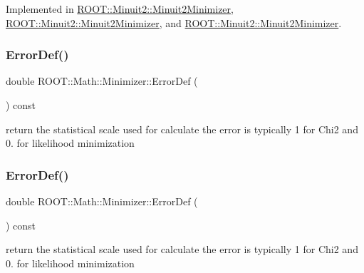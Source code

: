 Implemented in \mbox{\hyperlink{classROOT_1_1Minuit2_1_1Minuit2Minimizer_ab9c1bfaaaf4c12acd1fd96ece3509269}{R\+O\+O\+T\+::\+Minuit2\+::\+Minuit2\+Minimizer}}, \mbox{\hyperlink{classROOT_1_1Minuit2_1_1Minuit2Minimizer_ab9c1bfaaaf4c12acd1fd96ece3509269}{R\+O\+O\+T\+::\+Minuit2\+::\+Minuit2\+Minimizer}}, and \mbox{\hyperlink{classROOT_1_1Minuit2_1_1Minuit2Minimizer_ab9c1bfaaaf4c12acd1fd96ece3509269}{R\+O\+O\+T\+::\+Minuit2\+::\+Minuit2\+Minimizer}}.

\mbox{\label{classROOT_1_1Math_1_1Minimizer_aa4e46f31bb8dfb770fcb704e585a3593}} 
\subsubsection{\texorpdfstring{ErrorDef()}{ErrorDef()}\hspace{0.1cm}{\footnotesize\ttfamily [1/3]}}
{\footnotesize\ttfamily double R\+O\+O\+T\+::\+Math\+::\+Minimizer\+::\+Error\+Def (\begin{DoxyParamCaption}{ }\end{DoxyParamCaption}) const\hspace{0.3cm}{\ttfamily [inline]}}

return the statistical scale used for calculate the error is typically 1 for Chi2 and 0. for likelihood minimization \mbox{\label{classROOT_1_1Math_1_1Minimizer_aa4e46f31bb8dfb770fcb704e585a3593}} 
\subsubsection{\texorpdfstring{ErrorDef()}{ErrorDef()}\hspace{0.1cm}{\footnotesize\ttfamily [2/3]}}
{\footnotesize\ttfamily double R\+O\+O\+T\+::\+Math\+::\+Minimizer\+::\+Error\+Def (\begin{DoxyParamCaption}{ }\end{DoxyParamCaption}) const\hspace{0.3cm}{\ttfamily [inline]}}

return the statistical scale used for calculate the error is typically 1 for Chi2 and 0. for likelihood minimization \mbox{\label{classROOT_1_1Math_1_1Minimizer_aa4e46f31bb8dfb770fcb704e585a3593}} 
